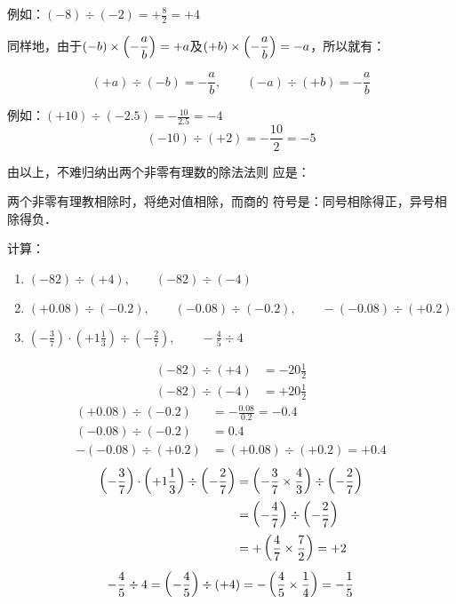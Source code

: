 例如：$(-8)\div (-2)=+\frac{8}{2}=+4$

同样地，由于$(-b)\times \left(-\dfrac{a}{b}\right)=+a$及$(+b)\times \left(-\dfrac{a}{b}\right)=-a$，所以就有：

\[(+a)\div (-b)=-\frac{a}{b},\qquad   (-a)\div (+b)=-\frac{a}{b}\]

例如：$(+10)\div (-2.5)=-\frac{10}{2.5}=-4$
\[(-10)\div (+2)=-\frac{10}{2}=-5 \]

由以上，不难归纳出两个非零有理数的除法法则
应是：

\begin{blk}{}
    两个非零有理教相除时，将绝对值相除，而商的
符号是：同号相除得正，异号相除得负．
\end{blk}
    
\begin{example}
计算：
\begin{enumerate}
    \item $(-82)\div (+4),\qquad (-82)\div (-4)$
    \item $(+0.08)\div (-0.2),\qquad (-0.08)\div (-0.2),\qquad -(-0.08)\div (+0.2)$
    \item $\left(-\frac{3}{7}\right)\cdot \left(+1\frac{1}{3}\right)\div \left(-\frac{2}{7}\right),\qquad -\frac{4}{5}\div 4$
\end{enumerate}
\end{example}

\begin{solution}
\[\begin{split}
    (-82)\div (+4)&=-20\frac{1}{2}\\
    (-82)\div (-4)&=+20\frac{1}{2}
\end{split}\]
\[\begin{split}
    (+0.08)\div (-0.2)&=-\frac{0.08}{0.2}=-0.4\\
    (-0.08)\div (-0.2)&=0.4\\
    -(-0.08)\div (+0.2)&=(+0.08)\div (+0.2)=+0.4
\end{split}\]
\[\begin{split}
    \left(-\dfrac{3}{7}\right)\cdot \left(+1\dfrac{1}{3}\right)\div \left(-\dfrac{2}{7}\right)&= \left(-\dfrac{3}{7}\times\dfrac{4}{3}\right) \div \left(-\dfrac{2}{7}\right)\\
    &=\left(-\dfrac{4}{7}\right)\div \left(-\dfrac{2}{7}\right)\\
    &=+\left(\dfrac{4}{7}\times\dfrac{7}{2}\right)=+2
\end{split}\]
\[-\dfrac{4}{5}\div 4=\left(-\dfrac{4}{5}\right)\div (+4)=-\left(\dfrac{4}{5}\times\dfrac{1}{4}\right)=-\dfrac{1}{5} \]
\end{solution}

